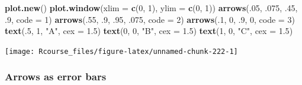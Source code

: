 \documentclass[]{book}
\newenvironment{Shaded}{\begin{snugshade}}{\end{snugshade}}
\newcommand{\KeywordTok}[1]{\textcolor[rgb]{0.13,0.29,0.53}{\textbf{#1}}}
\newcommand{\DataTypeTok}[1]{\textcolor[rgb]{0.13,0.29,0.53}{#1}}
\newcommand{\DecValTok}[1]{\textcolor[rgb]{0.00,0.00,0.81}{#1}}
\newcommand{\FloatTok}[1]{\textcolor[rgb]{0.00,0.00,0.81}{#1}}
\newcommand{\StringTok}[1]{\textcolor[rgb]{0.31,0.60,0.02}{#1}}
\newcommand{\NormalTok}[1]{#1}
\theoremstyle{definition}
\theoremstyle{definition}
\theoremstyle{definition}
\theoremstyle{remark}
\begin{document}
\begin{Shaded}
\begin{Highlighting}[]
\KeywordTok{plot.new}\NormalTok{()}
\KeywordTok{plot.window}\NormalTok{(}\DataTypeTok{xlim =} \KeywordTok{c}\NormalTok{(}\DecValTok{0}\NormalTok{, }\DecValTok{1}\NormalTok{), }\DataTypeTok{ylim =} \KeywordTok{c}\NormalTok{(}\DecValTok{0}\NormalTok{, }\DecValTok{1}\NormalTok{))}
\KeywordTok{arrows}\NormalTok{(.}\DecValTok{05}\NormalTok{, .}\DecValTok{075}\NormalTok{, .}\DecValTok{45}\NormalTok{, .}\DecValTok{9}\NormalTok{, }\DataTypeTok{code =} \DecValTok{1}\NormalTok{)}
\KeywordTok{arrows}\NormalTok{(.}\DecValTok{55}\NormalTok{, .}\DecValTok{9}\NormalTok{, .}\DecValTok{95}\NormalTok{, .}\DecValTok{075}\NormalTok{, }\DataTypeTok{code =} \DecValTok{2}\NormalTok{)}
\KeywordTok{arrows}\NormalTok{(.}\DecValTok{1}\NormalTok{, }\DecValTok{0}\NormalTok{, .}\DecValTok{9}\NormalTok{, }\DecValTok{0}\NormalTok{, }\DataTypeTok{code =} \DecValTok{3}\NormalTok{)}
\KeywordTok{text}\NormalTok{(.}\DecValTok{5}\NormalTok{, }\DecValTok{1}\NormalTok{, }\StringTok{"A"}\NormalTok{, }\DataTypeTok{cex =} \FloatTok{1.5}\NormalTok{)}
\KeywordTok{text}\NormalTok{(}\DecValTok{0}\NormalTok{, }\DecValTok{0}\NormalTok{, }\StringTok{"B"}\NormalTok{, }\DataTypeTok{cex =} \FloatTok{1.5}\NormalTok{)}
\KeywordTok{text}\NormalTok{(}\DecValTok{1}\NormalTok{, }\DecValTok{0}\NormalTok{, }\StringTok{"C"}\NormalTok{, }\DataTypeTok{cex =} \FloatTok{1.5}\NormalTok{)}
\end{Highlighting}
\end{Shaded}

\texttt{[image: Rcourse\_files/figure-latex/unnamed-chunk-222-1]}

\subsubsection{Arrows as error bars}\label{arrows-as-error-bars}
\end{document}

